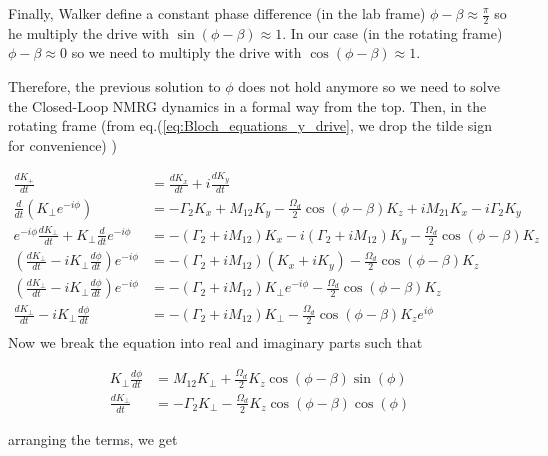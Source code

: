 \documentclass{article}
\begin{document}
Finally, Walker define a constant phase difference (in the lab frame) $\phi-\beta\approx \frac{\pi}{2}$ so he multiply the drive with $\sin{\left(\phi-\beta\right)}\approx 1$. In our case (in the rotating frame) $\phi-\beta\approx 0$ so we need to multiply the drive with $\cos{\left(\phi-\beta\right)}\approx 1$.

Therefore, the previous solution to $\phi$ does not hold anymore so we need to solve the Closed-Loop NMRG dynamics in a formal way from the top. Then, in the rotating frame (from eq.(\ref{eq:Bloch_equations_y_drive}, we drop the tilde sign for convenience) )

\begin{align}
    \frac{d K_{+}}{dt} &= \frac{d K_{x}}{dt} + i\frac{d K_{y}}{dt}\\
    \frac{d }{dt}\left( K_{\perp}e^{-i\phi}\right) &= -\Gamma_2 K_x + M_{12} K_y - \frac{\Omega_d}{2} \cos{\left(\phi-\beta\right)}K_z + iM_{21}K_x - i\Gamma_2 K_y\\
    e^{-i\phi}\frac{d K_{\perp}}{dt} + K_{\perp}\frac{d }{dt}e^{-i\phi} &= -\left(\Gamma_2 + iM_{12}\right)K_x -i\left(\Gamma_2 + iM_{12}\right)K_y - \frac{\Omega_d}{2} \cos{\left(\phi-\beta\right)}K_z \\
    \left(\frac{d K_{\perp}}{dt} -i K_{\perp}\frac{d \phi}{dt}\right)e^{-i\phi} &= -\left(\Gamma_2 + iM_{12}\right)\left(K_x +iK_y\right) - \frac{\Omega_d}{2}\cos{\left(\phi-\beta\right)} K_z \\
    \left(\frac{d K_{\perp}}{dt} -i K_{\perp}\frac{d \phi}{dt}\right)e^{-i\phi} &= -\left(\Gamma_2 + iM_{12}\right)K_{\perp}e^{-i\phi} - \frac{\Omega_d}{2} \cos{\left(\phi-\beta\right)}K_z \\
    \frac{d K_{\perp}}{dt} -i K_{\perp}\frac{d \phi}{dt} &= -\left(\Gamma_2 + iM_{12}\right)K_{\perp} - \frac{\Omega_d}{2}\cos{\left(\phi-\beta\right)} K_z e^{i\phi} \\
\end{align}
Now we break the equation into real and imaginary parts such that

\begin{align}
      K_{\perp}\frac{d \phi}{dt} &=  M_{12}K_{\perp} +\frac{\Omega_d}{2} K_z \cos{\left(\phi-\beta\right)}\sin{\left(\phi\right)}\\
     \frac{d K_{\perp}}{dt}  &= -\Gamma_2 K_{\perp} - \frac{\Omega_d}{2} K_z \cos{\left(\phi-\beta\right)}\cos{\left(\phi\right)}
\end{align}

arranging the terms, we get
\end{document}
